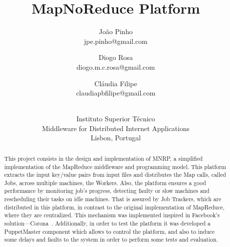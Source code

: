 \documentclass[times, 10pt,twocolumn]{article}
\begin{document}
	\title{MapNoReduce Platform}

	\author{
        João Pinho\\jpe.pinho@gmail.com
        \and Diogo Rosa\\diogo.m.c.rosa@gmail.com
        \and Cláudia Filipe\\claudiapbfilipe@gmail.com\\\\
		\and Instituto Superior Técnico\\
        Middleware for Distributed Internet Applications\\
        Lisbon, Portugal
    }
	\maketitle
	\thispagestyle{empty}


	\begin{abstract}
		This project consists in the design and implementation of \ac{MNRP}, a simplified implementation of the MapReduce middleware and programming model. This platform extracts the input key/value pairs from input files and distributes the Map calls, called Jobs, across multiple machines, the Workers.
		Also, the platform ensures a good performance by monitoring job's progress, detecting faulty or slow machines and rescheduling their tasks on idle machines. That is assured by Job Trackers, which are distributed in this platform, in contrast to the original implementation of MapReduce, where they are centralized. This mechanism was implemented inspired in Facebook's solution—Corona~\cite{Facebook2012}.
		Additionally, in order to test the platform it was developed a PuppetMaster component which allows to control the platform, and also to induce some delays and faults to the system in order to perform some tests and evaluation.
	\end{abstract}
\end{document}
